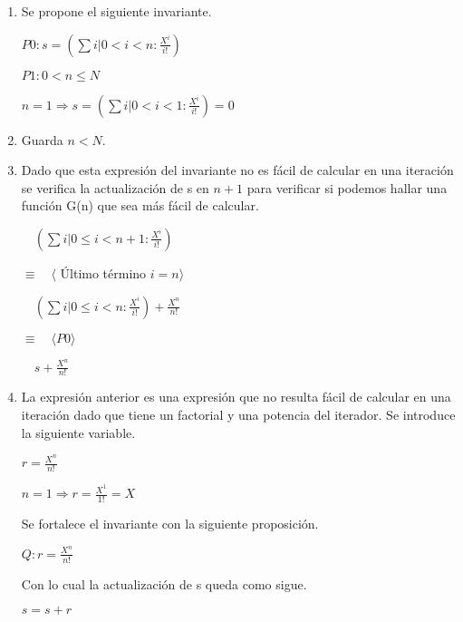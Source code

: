 \documentclass[hidelinks]{article}
\begin{document}
\begin{enumerate}
	\item Se propone el siguiente invariante. \par
	      \begin{center}
		      $P0: s = (\sum i| 0 < i < n : \frac{X^i}{i!})$ \par
		      $P1: 0 < n \leq N$ \par
	      \end{center}
	      $n=1 \Rightarrow s = (\sum i| 0 < i < 1: \frac{X^i}{i!})=0$ \par
	\item Guarda $n < N$. \par
	\item Dado que esta expresión del invariante no es fácil de calcular en una iteración
	      se verifica la actualización de s en $n+1$ para verificar si podemos hallar una
	      función G(n) que sea más fácil de calcular.\par
	      $\quad (\sum i| 0\leq i < n+1 : \frac{X^i}{i!})$ \par
	      $\equiv \quad \langle$ Último término $ i = n \rangle$ \par
	      $\quad (\sum i| 0\leq i < n : \frac{X^i}{i!})+\frac{X^n}{n!}$ \par
	      $\equiv \quad \langle P0 \rangle$ \par
	      $\quad s+\frac{X^n}{n!}$ \par
	\item La expresión anterior es una expresión que no resulta fácil de calcular en una
	      iteración dado que tiene un factorial y una potencia del iterador. Se introduce
	      la siguiente variable.\par
	      $r = \frac{X^n}{n!}$ \par
	      $n = 1 \Rightarrow r = \frac{X^1}{1!}=X$ \par
	      Se fortalece el invariante con la siguiente proposición.

	      \begin{center}
		      $Q: r = \frac{X^n}{n!}$ \par
	      \end{center}

	      Con lo cual la actualización de s queda como sigue. \par
	      \begin{center}
		      $s = s+r$ \par
	      \end{center}


\end{enumerate}
\end{document}
